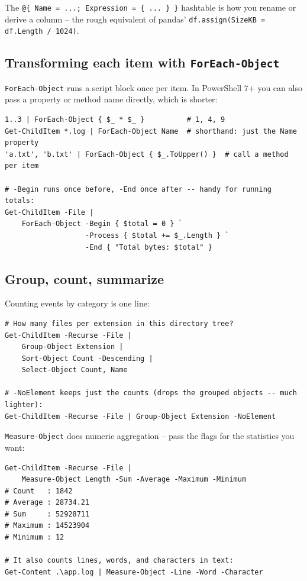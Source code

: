 \documentclass[11pt,a4paper]{article}
\newcommand{\cmd}[1]{\texttt{\textcolor{pwshKw}{#1}}}
\begin{document}
The \texttt{@\{ Name = ...; Expression = \{ ... \} \}} hashtable is how
you rename or derive a column -- the rough equivalent of pandas'
\texttt{df.assign(SizeKB = df.Length / 1024)}.

\subsection*{Transforming each item with \texttt{ForEach-Object}}

\cmd{ForEach-Object} runs a script block once per item. In PowerShell 7+
you can also pass a property or method name directly, which is shorter:

\begin{lstlisting}[style=pwshstyle]
1..3 | ForEach-Object { $_ * $_ }          # 1, 4, 9
Get-ChildItem *.log | ForEach-Object Name  # shorthand: just the Name property
'a.txt', 'b.txt' | ForEach-Object { $_.ToUpper() }  # call a method per item

# -Begin runs once before, -End once after -- handy for running totals:
Get-ChildItem -File |
    ForEach-Object -Begin { $total = 0 } `
                   -Process { $total += $_.Length } `
                   -End { "Total bytes: $total" }
\end{lstlisting}

\subsection*{Group, count, summarize}

Counting events by category is one line:

\begin{lstlisting}[style=pwshstyle]
# How many files per extension in this directory tree?
Get-ChildItem -Recurse -File |
    Group-Object Extension |
    Sort-Object Count -Descending |
    Select-Object Count, Name

# -NoElement keeps just the counts (drops the grouped objects -- much lighter):
Get-ChildItem -Recurse -File | Group-Object Extension -NoElement
\end{lstlisting}

\cmd{Measure-Object} does numeric aggregation -- pass the flags for the
statistics you want:

\begin{lstlisting}[style=pwshstyle]
Get-ChildItem -Recurse -File |
    Measure-Object Length -Sum -Average -Maximum -Minimum
# Count   : 1842
# Average : 28734.21
# Sum     : 52928711
# Maximum : 14523904
# Minimum : 12

# It also counts lines, words, and characters in text:
Get-Content .\app.log | Measure-Object -Line -Word -Character
\end{lstlisting}
\end{document}
